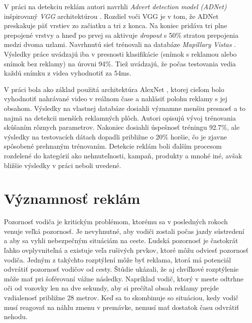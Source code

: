 
V práci \cite{Hossari} na detekciu reklám autori navrhli \textit{Advert detection model (ADNet)} inšpirovaný \textit{VGG} architektúrou \cite{simonyan2015deep}. Rozdiel voči VGG je v tom, že ADNet preskakuje päť vrstiev zo začiatku a tri z konca. Na koniec pridáva tri plne prepojené vrstvy a hneď po prvej sa aktivuje \textit{dropout} s 50\% stratou prepojenia medzi dvoma uzlami. Navrhnutú sieť trénovali na databáze \textit{Mapillary Vistas} \cite{Mapillary}. Výsledky práce uvádzajú iba v presnosti klasifikácie (snímok s reklamou alebo snímok bez reklamy) na úrovni 94\%. Tiež uvádzajú, že počas testovania vedia každú snímku z videa vyhodnotiť za 54ms.

V práci \cite{GeoTag} bola ako základ použitá architektúra AlexNet \cite{AlexNet}, ktorej cieľom bolo vyhodnotiť nahrávané video v reálnom čase a nahlásiť polohu reklamy s jej obsahom. Výsledky na vlastnej databáze dosiahli významne menšiu presnosť a to najmä na detekcii menších reklamných plôch. Autori opisujú vývoj trénovania skúšaním rôznych parametrov. Nakoniec dosiahli úspešnosť tréningu 92.7\%, ale výsledky na testovacích dátach dopadli približne o 20\% horšie, čo je zjavne spôsobené prehnaným trénovaním. Detekcie reklám boli ďalším procesom rozdelené do kategórií ako nehnuteľnosti, kampaň, produkty a mnohé iné, avšak bližšie výsledky v práci neboli uvedené.

\section{Významnosť reklám}

Pozornosť vodiča je kritickým problémom, ktorému sa v posledných rokoch venuje veľká pozornosť. Je nevyhnutné, aby vodiči zostali počas jazdy sústredení  a aby sa vyhli nebezpečným situáciám na ceste. Ľudská pozornosť je častokrát ľahko ovplyvniteľná a existuje veľa rušivých prvkov, ktoré môžu odviesť pozornosť vodiča. Jedným z takýchto rozptýlení môže byť reklama, ktorá má potenciál odvrátiť pozornosť vodičov od cesty. Štúdie ukázali, že aj chvíľkové rozptýlenie môže mať pri šoférovaní vážne následky. Napríklad vodič, ktorý v meste odtrhne oči od vozovky len na dve sekundy, aby si prečítal obsah reklamy prejde vzdialenosť približne 28 metrov. Keď sa to skombinuje so situáciou, kedy vodič musí reagovať na náhlu zmenu v premávke, nemusí mať dostatok času odvrátiť nehodu.

